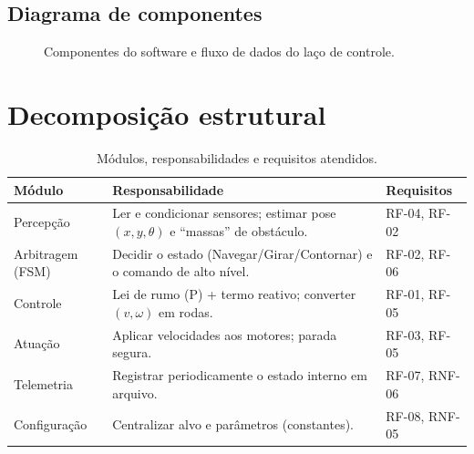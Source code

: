 \subsection{Diagrama de componentes}
\begin{figure}[H]\centering
{}
\caption{Componentes do software e fluxo de dados do laço de controle.}
\label{fig:comp}
\end{figure}

\section{Decomposição estrutural}
\begin{table}[H]\centering
\caption{Módulos, responsabilidades e requisitos atendidos.}
\renewcommand{\arraystretch}{1.2}
\begin{tabularx}{\textwidth}{@{}l X l@{}}
\toprule
\textbf{Módulo} & \textbf{Responsabilidade} & \textbf{Requisitos} \\
\midrule
Percepção & Ler e condicionar sensores; estimar pose $(x,y,\theta)$ e ``massas'' de obstáculo. & RF-04, RF-02 \\
Arbitragem (FSM) & Decidir o estado (Navegar/Girar/Contornar) e o comando de alto nível. & RF-02, RF-06 \\
Controle & Lei de rumo (P) + termo reativo; converter $(v,\omega)$ em rodas. & RF-01, RF-05 \\
Atuação & Aplicar velocidades aos motores; parada segura. & RF-03, RF-05 \\
Telemetria & Registrar periodicamente o estado interno em arquivo. & RF-07, RNF-06 \\
Configuração & Centralizar alvo e parâmetros (constantes). & RF-08, RNF-05 \\
\bottomrule
\end{tabularx}
\end{table}


